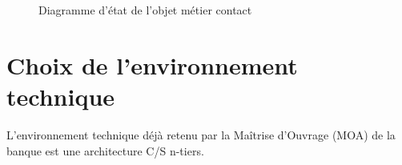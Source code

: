 \begin{figure}[H]
\noindent{}
\caption{Diagramme d'état de l'objet métier contact}
\end{figure}

\section{Choix  de  l’environnement  technique}
L’environnement  technique  déjà  retenu  par  la 
Maîtrise d’Ouvrage (MOA) de la banque est une architecture C/S n-tiers. 